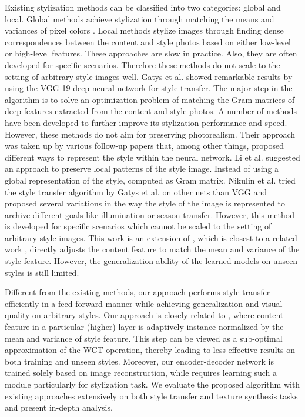Existing stylization methods can be classified into two categories: global and local. Global methods \cite{bib12, bib13} achieve stylization through matching the means and variances of pixel colors \cite{bib12}. Local methods \cite{bib14} stylize images through finding dense correspondences between the content and style photos based on either low-level or high-level features. These approaches are slow in practice. Also, they are often developed for specific scenarios. Therefore these methods do not scale to the setting of arbitrary style images well.\newline
Gatys et al. \cite{bib7, bib8} showed remarkable results by using the VGG-19 deep neural network for style transfer. The major step in the algorithm is to solve an optimization problem of matching the Gram matrices of deep features extracted from the content and style photos. A number of methods have been developed \cite{bib15, bib16, bib17} to further improve its stylization performance and speed. However, these methods do not aim for preserving photorealism.\newline
Their approach was taken up by various follow-up papers that, among other things, proposed different  ways  to  represent  the  style  within  the  neural  network. Li et al. \cite{bib15} suggested an approach to preserve local patterns of the style image. Instead of using a global representation of the style, computed as Gram matrix.\newline
Nikulin et al. \cite{bib18} tried the style transfer algorithm by Gatys et al. on other nets than VGG and proposed several  variations  in  the  way  the  style  of  the  image  is  represented  to  archive different goals like illumination or season transfer. However, this method is developed for specific scenarios which cannot be scaled to the setting of arbitrary style images.\newline
This work is an extension of \cite{bib11}, which is closest to a related work \cite{bib19}, directly adjusts the content feature to match the mean and variance of the style feature. However, the generalization ability of the learned models on unseen styles is still limited.\newline

Different from the existing methods, our approach performs style transfer efficiently in a feed-forward
manner while achieving generalization and visual quality on arbitrary styles. Our approach is closely
related to \cite{bib15}, where content feature in a particular (higher) layer is adaptively instance normalized
by the mean and variance of style feature. This step can be viewed as a sub-optimal approximation
of the WCT operation, thereby leading to less effective results on both training and unseen styles.
Moreover, our encoder-decoder network is trained solely based on image reconstruction, while \cite{bib15}
requires learning such a module particularly for stylization task. We evaluate the proposed algorithm
with existing approaches extensively on both style transfer and texture synthesis tasks and present
in-depth analysis.